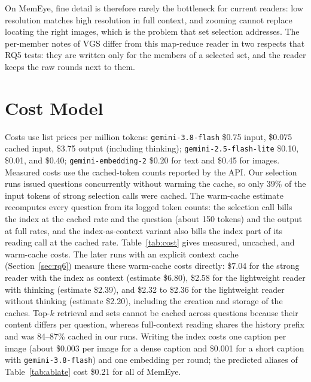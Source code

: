 On MemEye, fine detail is therefore rarely the bottleneck for current readers: low resolution matches high resolution in full context, and zooming cannot replace locating the right images, which is the problem that set selection addresses. The per-member notes of VGS differ from this map-reduce reader in two respects that RQ5 tests: they are written only for the members of a selected set, and the reader keeps the raw rounds next to them.

\section{Cost Model}
\label{app:cost}

Costs use list prices per million tokens: \texttt{gemini-3.8-flash} \$0.75 input, \$0.075 cached input, \$3.75 output (including thinking); \texttt{gemini-2.5-flash-lite} \$0.10, \$0.01, and \$0.40; \texttt{gemini-embedding-2} \$0.20 for text and \$0.45 for images. Measured costs use the cached-token counts reported by the API. Our selection runs issued questions concurrently without warming the cache, so only 39\% of the input tokens of strong selection calls were cached. The warm-cache estimate recomputes every question from its logged token counts: the selection call bills the index at the cached rate and the question (about 150 tokens) and the output at full rates, and the index-as-context variant also bills the index part of its reading call at the cached rate. Table~\ref{tab:cost} gives measured, uncached, and warm-cache costs. The later runs with an explicit context cache (Section~\ref{sec:rq6}) measure these warm-cache costs directly: \$7.04 for the strong reader with the index as context (estimate \$6.80), \$2.58 for the lightweight reader with thinking (estimate \$2.39), and \$2.32 to \$2.36 for the lightweight reader without thinking (estimate \$2.20), including the creation and storage of the caches. Top-$k$ retrieval and \qss{} sets cannot be cached across questions because their content differs per question, whereas full-context reading shares the history prefix and was 84--87\% cached in our runs. Writing the index costs one caption per image (about \$0.003 per image for a dense caption and \$0.001 for a short caption with \texttt{gemini-3.8-flash}) and one embedding per round; the predicted aliases of Table~\ref{tab:ablate} cost \$0.21 for all of MemEye.

